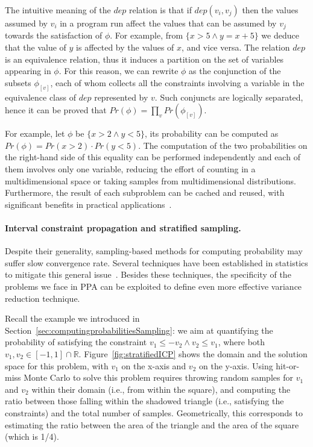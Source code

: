 The intuitive meaning of the $\textit{dep}$ relation is that if $\textit{dep}(v_i,v_j)$ then the values assumed by $v_i$ in a program run affect the values that can be assumed by $v_j$ towards the satisfaction of $\phi$. For example, from $\{x>5 \land y=x+5\}$ we deduce that the value of $y$ is affected by the values of $x$, and vice versa. The relation $\textit{dep}$ is an equivalence relation, thus it induces a partition on the set of variables appearing in $\phi$. For this reason, we can rewrite $\phi$ as the conjunction of the subsets $\phi_{[v]}$, each of whom collects all the constraints involving a variable in the equivalence class of $\textit{dep}$ represented by $v$. Such conjuncts are logically separated, hence it can be proved that $\textit{Pr}(\phi)= \prod_{v} \textit{Pr}(\phi_{[v]})$. 

For example, let $\phi$ be $\{x>2 \land y<5\}$, its probability can be computed as $\textit{Pr}(\phi)=\textit{Pr}(x>2) \cdot \textit{Pr}(y<5)$. The computation of the two probabilities on the right-hand side of this equality can be performed independently and each of them involves only one variable, reducing the effort of counting in a multidimensional space or taking samples from multidimensional distributions. Furthermore, the result of each subproblem can be cached and reused, with significant benefits in practical applications~\cite{Filieri2013}.



\paragraph{Interval constraint propagation and stratified sampling.}
Despite their generality, sampling-based methods for computing probability may suffer slow convergence rate. Several techniques have been established in statistics to mitigate this general issue~\cite{Robert2005MCBook}. Besides these techniques, the specificity of the problems we face in PPA can be exploited to define even more effective variance reduction technique.

Recall the example we introduced in Section~\ref{sec:computingprobabilitiesSampling}: we aim at quantifying the probability of satisfying the constraint 
$v_1 \leq -v_2 \land v_2 \leq v_1$, where both $v_1, v_2 \in [-1, 1] \cap \mathbb{R}$. Figure~\ref{fig:stratifiedICP} shows the domain and the solution space for this problem, with $v_1$ on the x-axis and $v_2$ on the y-axis. Using hit-or-miss Monte Carlo to solve this problem requires throwing random samples for $v_1$ and $v_2$ within their domain (i.e., from within the square), and computing the ratio between those falling within the shadowed triangle (i.e., satisfying the constraints) and the total number of samples. Geometrically, this corresponds to estimating the ratio between the area of the triangle and the area of the square (which is 1/4).

